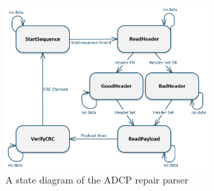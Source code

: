 \begin{figure}[h]
\centering
      \includegraphics[width=0.7\textwidth]{repair}
        \caption{A state diagram of the ADCP repair parser}
\end{figure}

